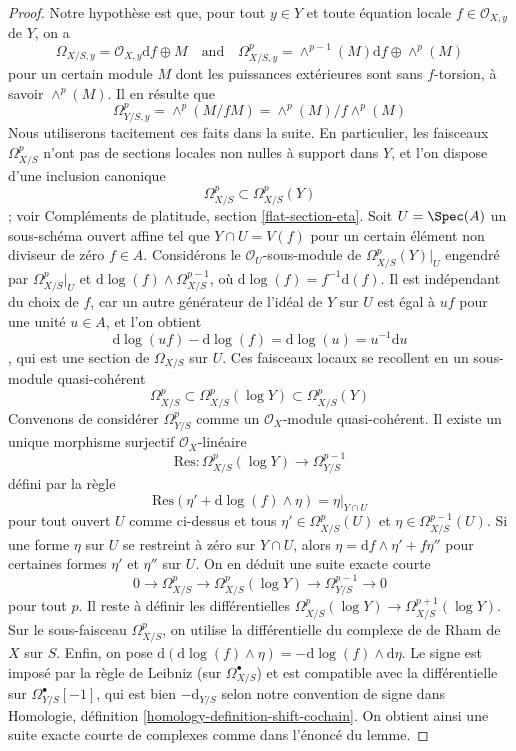 \begin{proof}
Notre hypothèse est que, pour tout $y \in Y$ et toute équation locale
$f \in \mathcal{O}_{X, y}$ de $Y$, on a
$$
\Omega_{X/S, y} = \mathcal{O}_{X, y}\text{d}f \oplus M
\quad\text{and}\quad
\Omega^p_{X/S, y} = \wedge^{p - 1}(M)\text{d}f \oplus \wedge^p(M)
$$
pour un certain module $M$ dont les puissances extérieures sont sans $f$-torsion, à savoir $\wedge^p(M)$.
Il en résulte que
$$
\Omega^p_{Y/S, y} = \wedge^p(M/fM) = \wedge^p(M)/f\wedge^p(M)
$$
Nous utiliserons tacitement ces faits dans la suite.
En particulier, les faisceaux $\Omega^p_{X/S}$ n'ont pas de sections locales non nulles
à support dans $Y$, et l'on dispose d'une inclusion canonique
$$
\Omega^p_{X/S} \subset \Omega^p_{X/S}(Y)
$$ ;
voir Compléments de platitude, section \ref{flat-section-eta}. Soit $U = \Spec(A)$
un sous-schéma ouvert affine tel que $Y \cap U = V(f)$ pour un certain
élément non diviseur de zéro $f \in A$. Considérons le $\mathcal{O}_U$-sous-module
de $\Omega^p_{X/S}(Y)|_U$ engendré par
$\Omega^p_{X/S}|_U$ et $\text{d}\log(f) \wedge \Omega^{p - 1}_{X/S}$,
où $\text{d}\log(f) = f^{-1}\text{d}(f)$.
Il est indépendant du choix de $f$, car un autre générateur de
l'idéal de $Y$ sur $U$ est égal à $uf$ pour une unité $u \in A$, et l'on obtient
$$
\text{d}\log(uf) - \text{d}\log(f) = \text{d}\log(u) = u^{-1}\text{d}u
$$,
qui est une section de $\Omega_{X/S}$ sur $U$. Ces faisceaux locaux
se recollent en un sous-module quasi-cohérent
$$
\Omega^p_{X/S} \subset \Omega^p_{X/S}(\log Y) \subset \Omega^p_{X/S}(Y)
$$
Convenons de considérer $\Omega^p_{Y/S}$ comme un
$\mathcal{O}_X$-module quasi-cohérent. Il existe un unique morphisme surjectif
$\mathcal{O}_X$-linéaire
$$
\text{Res} : \Omega^p_{X/S}(\log Y) \to \Omega^{p - 1}_{Y/S}
$$
défini par la règle
$$
\text{Res}(\eta' + \text{d}\log(f) \wedge \eta) = \eta|_{Y \cap U}
$$
pour tout ouvert $U$ comme ci-dessus et tous
$\eta' \in \Omega^p_{X/S}(U)$ et $\eta \in \Omega^{p - 1}_{X/S}(U)$.
Si une forme $\eta$ sur $U$ se restreint à zéro sur $Y \cap U$, alors
$\eta = \text{d}f \wedge \eta' + f\eta''$ pour certaines formes $\eta'$ et $\eta''$
sur $U$. On en déduit
une suite exacte courte
$$
0 \to \Omega^p_{X/S} \to \Omega^p_{X/S}(\log Y) \to \Omega^{p - 1}_{Y/S} \to 0
$$
pour tout $p$. Il reste à définir les différentielles
$\Omega^p_{X/S}(\log Y) \to \Omega^{p + 1}_{X/S}(\log Y)$.
Sur le sous-faisceau $\Omega^p_{X/S}$, on utilise la différentielle du
complexe de de Rham de $X$ sur $S$. Enfin, on pose
$\text{d}(\text{d}\log(f) \wedge \eta) = -\text{d}\log(f) \wedge \text{d}\eta$.
Le signe est imposé par la règle de Leibniz (sur $\Omega^\bullet_{X/S}$)
et est compatible avec la différentielle sur $\Omega^\bullet_{Y/S}[-1]$,
qui est bien $-\text{d}_{Y/S}$ selon notre convention de signe dans
Homologie, définition \ref{homology-definition-shift-cochain}.
On obtient ainsi une suite exacte courte
de complexes comme dans l'énoncé du lemme.
\end{proof}

